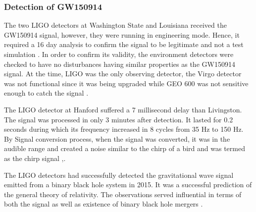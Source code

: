 \subsubsection{Detection of GW150914}
\hspace{0.5cm} The two LIGO detectors at Washington State and Louisiana received the GW150914 signal, however, they were running in engineering mode. Hence, it required a 16 day analysis to confirm the signal to be legitimate and not a test simulation \cite{LIGO_org}. In order to confirm its validity, the environment detectors were checked to have no disturbances having similar properties as the GW150914 signal. At the time, LIGO was the only observing detector, the Virgo detector was not functional since it was being upgraded while GEO 600 was not sensitive enough to catch the signal \cite{PhysRevLett.116.061102}.

The LIGO detector at Hanford suffered a 7 millisecond delay than Livingston. The signal was processed in only 3 minutes after detection. It lasted for 0.2 seconds during which its frequency increased in 8 cycles from 35 Hz to 150 Hz. By Signal conversion process, when the signal was converted, it was in the audible range and created a noise similar to the chirp of a bird and was termed as the chirp signal \cite{PhysRevLett.116.061102},\cite{LIGO_org}.  

The LIGO detectors had successfully detected the gravitational wave signal emitted from a binary black hole system in 2015. It was a successful prediction of the general theory of relativity. The observations served influential in terms of both the signal as well as existence of binary black hole mergers \cite{PhysRevLett.116.061102}.

\pagebreak
















































































\pagebreak